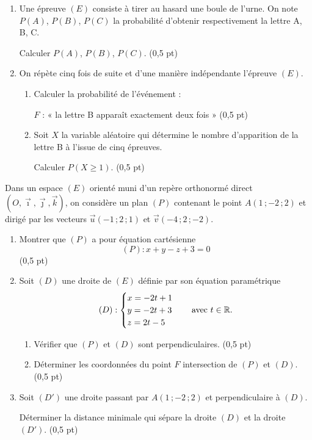 \begin{enumerate}
	\item Une épreuve $(E)$ consiste à tirer au hasard une boule de l'urne. On note $P(A)$, $P(B)$, $P(C)$ la probabilité d'obtenir respectivement la lettre A, B, C.

	Calculer $P(A)$, $P(B)$, $P(C)$. \hfill (0,5 pt)
	\item On répète cinq fois de suite et d'une manière indépendante l'épreuve $(E)$.
	\begin{enumerate}
		\item Calculer la probabilité de l'événement :

		$F$ : « la lettre B apparaît exactement deux fois » \hfill (0,5 pt)
		\item Soit $X$ la variable aléatoire qui détermine le nombre d'apparition de la lettre B à l'issue de cinq épreuves.

		Calculer $P(X \geqslant 1)$. \hfill (0,5 pt)
	\end{enumerate}
\end{enumerate}




Dans un espace $(E)$ orienté muni d'un repère orthonormé direct $(O,\vec{\imath},\vec{\jmath},\vec{k})$, on considère un plan $(P)$ contenant le point $A(1\,;-2\,;2)$ et dirigé par les vecteurs $\vec{u}(-1\,;2\,;1)$ et $\vec{v}(-4\,;2\,;-2)$.

\begin{enumerate}
	\item Montrer que $(P)$ a pour équation cartésienne
	$$
	(P) : x + y - z + 3 = 0
	$$
	\hfill (0,5 pt)
	\item Soit $(D)$ une droite de $(E)$ définie par son équation paramétrique
	$$
	(D) :
	\begin{cases}
		x = -2t+1 \\
		y = -2t+3 \\
		z = 2t-5
	\end{cases}
	\quad \text{avec } t \in \mathbb{R}.
	$$
	\begin{enumerate}
		\item Vérifier que $(P)$ et $(D)$ sont perpendiculaires. \hfill (0,5 pt)
		\item Déterminer les coordonnées du point $F$ intersection de $(P)$ et $(D)$. \hfill (0,5 pt)
	\end{enumerate}
	\item Soit $(D')$ une droite passant par $A(1\,;-2\,;2)$ et perpendiculaire à $(D)$.

	Déterminer la distance minimale qui sépare la droite $(D)$ et la droite $(D')$. \hfill (0,5 pt)
\end{enumerate}


